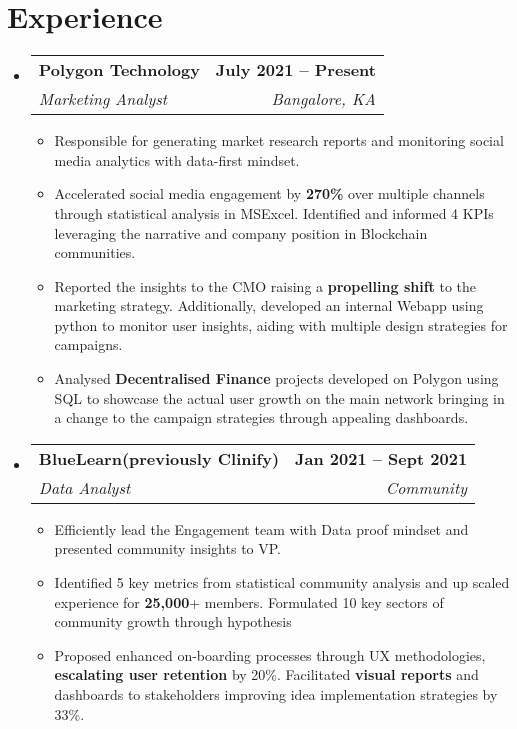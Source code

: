 \documentclass[letterpaper,11pt]{article}
\makeatletter
\newcommand{\resumeItem}[1]{
  \item\small{
    {#1 \vspace{-2pt}}
  }
}
\newcommand{\resumeSubheading}[4]{
  \vspace{-2pt}\item
    \begin{tabular*}{1.0\textwidth}[t]{l@{\extracolsep{\fill}}r}
      \textbf{#1} & \textbf{\small #2} \\
      \textit{\small#3} & \textit{\small #4} \\
    \end{tabular*}\vspace{-7pt}
}
\newcommand{\resumeSubHeadingListStart}{\begin{itemize}[leftmargin=0.0in, label={}]}
\newcommand{\resumeSubHeadingListEnd}{\end{itemize}}
\newcommand{\resumeItemListStart}{\begin{itemize}}
\newcommand{\resumeItemListEnd}{\end{itemize}\vspace{-5pt}}
\makeatother
\begin{document}
\section{Experience}
  \resumeSubHeadingListStart

    \resumeSubheading
      {Polygon Technology}{July 2021 -- Present}
      {Marketing Analyst}{Bangalore, KA}
      \resumeItemListStart
        \resumeItem{Responsible for generating market research reports and monitoring social media analytics with data-first mindset.}
        \resumeItem{Accelerated social media engagement by \textbf{270\%} over multiple channels through statistical analysis in MSExcel. Identified and informed 4 KPIs leveraging the narrative and company position in Blockchain communities.}
        \resumeItem{Reported the insights to the CMO raising a \textbf{propelling shift} to the marketing strategy. Additionally, developed an internal Webapp using python to monitor user insights, aiding with multiple design strategies for campaigns.}
        \resumeItem{Analysed \textbf{Decentralised Finance} projects developed on Polygon using SQL to showcase the actual user growth on the main network bringing in a change to the campaign strategies through appealing dashboards.}
      \resumeItemListEnd

    \resumeSubheading
      {BlueLearn(previously Clinify)}{Jan 2021 -- Sept 2021}
      {Data Analyst}{Community}
      \resumeItemListStart
        \resumeItem{Efficiently lead the Engagement team with Data proof mindset and presented community insights to VP.}
        \resumeItem{Identified 5 key metrics from statistical community analysis and up scaled experience for \textbf{25,000}+ members. Formulated 10 key sectors of community growth through hypothesis}
        \resumeItem{Proposed enhanced on-boarding processes through UX methodologies, \textbf{escalating user retention} by 20\%. Facilitated \textbf{visual reports} and dashboards to stakeholders improving idea implementation strategies by 33\%.}
    \resumeItemListEnd
    
  \resumeSubHeadingListEnd
\vspace{-16pt}

\end{document}
